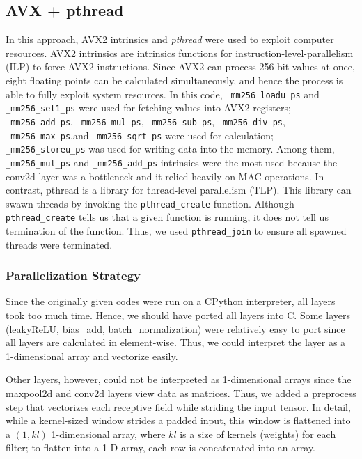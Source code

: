 \documentclass[a4paper,12pt]{article}
\begin{document}
\subsection{AVX + pthread}
In this approach, AVX2 intrinsics and \emph{pthread} were used to exploit computer resources. AVX2 intrinsics are intrinsics functions for instruction-level-parallelism (ILP) to force AVX2 instructions. Since AVX2 can process 256-bit values at once, eight floating points can be calculated simultaneously, and hence the process is able to fully exploit system resources. In this code, \lstinline{_mm256_loadu_ps} and \lstinline{_mm256_set1_ps} were used for fetching values into AVX2 registers; \lstinline{_mm256_add_ps}, \lstinline{_mm256_mul_ps}, \lstinline{_mm256_sub_ps}, \lstinline{_mm256_div_ps}, \lstinline{_mm256_max_ps},and  \lstinline{_mm256_sqrt_ps} were used for calculation; \lstinline{_mm256_storeu_ps} was used for writing data into the memory. Among them, \lstinline{_mm256_mul_ps} and \lstinline{_mm256_add_ps} intrinsics were the most used because the conv2d layer was a bottleneck and it relied heavily on MAC operations.
In contrast, pthread is a library for thread-level parallelism (TLP). This library can swawn threads by invoking the \lstinline{pthread_create} function. Although \lstinline{pthread_create} tells us that a given function is running, it does not tell us termination of the function. Thus, we used \lstinline{pthread_join} to ensure all spawned threads were terminated.

\subsubsection{Parallelization Strategy}
Since the originally  given codes were run on a CPython interpreter, all layers took too much time. Hence, we should have ported all layers into C. Some layers (leakyReLU, bias\_add, batch\_normalization) were relatively easy to port since all layers are calculated in element-wise. Thus, we could interpret the layer as a 1-dimensional array and vectorize easily.

Other layers, however, could not be interpreted as 1-dimensional arrays since the maxpool2d and conv2d layers view data as matrices. Thus, we added a preprocess step that vectorizes each receptive field while striding the input tensor. In detail, while a kernel-sized window strides a padded input, this window is flattened into a $(1, \textit{kl})$ 1-dimensional array, where $\textit{kl}$ is a size of kernels (weights) for each filter; to flatten into a 1-D array, each row is concatenated into an array. 
\end{document}
